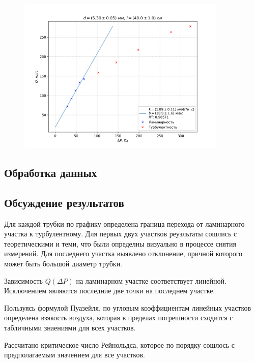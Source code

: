 \documentclass[a4paper,12pt]{article} %
\begin{document}
\begin{figure}[h!]
\begin{center}
\includegraphics[width=0.89\textwidth]{Q(P)3.png}
\end{center}
\end{figure}

\subsection*{Обработка данных}



\subsection{Обсуждение результатов}

Для каждой трубки по графику определена граница перехода от ламинарного участка к турбулентному. Для первых двух участков реузльтаты сошлись с теоретическими и теми, что были определны визуально в процессе снятия измерений. Для последнего участка выявлено отклонение, причной которого может быть большой диаметр трубки.

Зависимость $Q(\Delta P)$ на ламинарном участке соответствует линейной. Исключением являются последние две точки на последнем участке.

Пользуясь формулой Пуазейля, по угловым коэффициентам линейных участков определена взякость воздуха, которая в пределах погрешности сходится с табличными знаениями для всех участков.

Рассчитано критическое число Рейнольдса, которое по порядку сошлось с предполагаемым значением для все участков.
\end{document}
